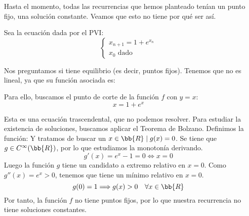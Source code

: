 Hasta el momento, todas las recurrencias que hemos planteado tenían un punto fijo, una solución constante. Veamos que esto no tiene por qué ser así.
\begin{ejemplo}
    Sea la ecuación dada por el PVI:
    \begin{equation*}
    \left\{ \begin{array}{l}
        x_{n+1} = 1+e^{x_n} \\
        x_0 \text{\ dado}
    \end{array}\right.
    \end{equation*}

    Nos preguntamos si tiene equilibrio (es decir, puntos fijos). Tenemos que no es lineal, ya que su función asociada es:

    Para ello, buscamos el punto de corte de la función $f$ con $y=x$:
    \begin{equation*}
        x = 1+e^{x}
    \end{equation*}
    
    Esta es una ecuación trascendental, que no podemos resolver. Para estudiar la existencia de soluciones, buscamos aplicar el Teorema de Bolzano. Definimos la función: 
    Y tratamos de buscar un $x \in \bb{R} \mid g(x) = 0$. Se tiene que $g \in C^\infty(\bb{R})$, por lo que estudiamos la monotonía derivando.
    \begin{equation*}
        g'(x) = e^x -1 = 0 \Leftrightarrow x = 0
    \end{equation*}
    Luego la función $g$ tiene un candidato a extremo relativo en $x=0$. Como $g''(x)=e^x>0$, tenemos que tiene un mínimo relativo en $x=0$.
    \begin{equation*}
        g(0)=1 \Longrightarrow g(x) > 0 \quad \forall x \in \bb{R} 
    \end{equation*}
    Por tanto, la función $f$ no tiene puntos fijos, por lo que nuestra recurrencia no tiene soluciones constantes.
\end{ejemplo}~\\

